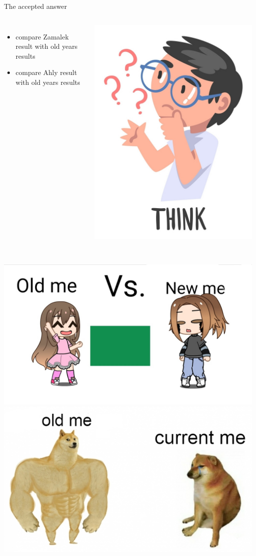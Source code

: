 \documentclass[8pt]{beamer}
\begin{document}
        \begin{frame}{The accepted answer}
            \begin{columns}
                \begin{itemize}
                    \item compare Zamalek result with old years results
                    \item compare Ahly result with old years results
                \end{itemize}
                \centering
                \includegraphics[width =.35\textwidth]{pics/think.jpg}
            \end{columns}\\[40px]
            \pause
            \includegraphics[width =.45\textwidth]{pics/better.jpg}
            \pause
            \includegraphics[width =.45\textwidth]{pics/worse.png}
        \end{frame}
\end{document}
